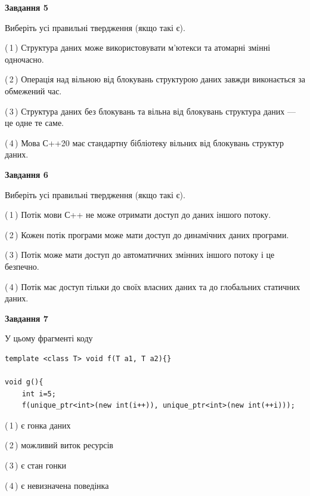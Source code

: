 \documentclass[12pt, ukrainian]{article}
\begin{document}
\begin {large}
{\begin{center}
\textbf{Завдання 5}
\end{center}

Виберіть усі правильні твердження (якщо такі є).\par
\vspace{2mm}

(\,1\,) Структура даних може використовувати м’ютекси та атомарні змінні одночасно.%

(\,2\,) Операція над вільною від блокувань структурою даних завжди виконається за обмежений час.%

(\,3\,) Структура даних без блокувань та вільна від блокувань структура даних --- це одне те саме.%

(\,4\,) Мова С++20 має стандартну бібліотеку вільних від блокувань структур даних.%
\newpage


\begin{center}
\textbf{Завдання 6}
\end{center}

Виберіть усі правильні твердження (якщо такі є).\par
\vspace{2mm}

(\,1\,) Потік мови С++ не може отримати доступ до даних іншого потоку.%

(\,2\,) Кожен потік програми може мати доступ до динамічних даних програми.%

(\,3\,) Потік може мати доступ до автоматичних змінних іншого потоку і це безпечно.%

(\,4\,) Потік має доступ тільки до своїх власних даних та до глобальних статичних даних.%


\begin{center}
\textbf{Завдання 7}
\end{center}

У цьому фрагменті коду
\begin{verbatim}
template <class T> void f(T a1, T a2){}

void g(){
    int i=5;
    f(unique_ptr<int>(new int(i++)), unique_ptr<int>(new int(++i)));
\end{verbatim}

(\,1\,) є гонка даних%

(\,2\,) можливий виток ресурсів%

(\,3\,) є стан гонки%

(\,4\,) є невизначена поведінка%

}
\end {large}

\vspace{4mm}
\newpage
\end{document}
